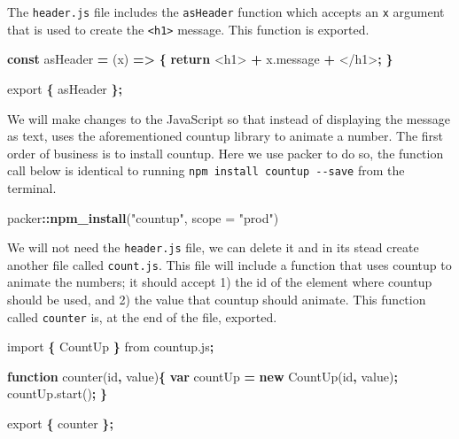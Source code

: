 \documentclass[
  10pt,
]{krantz}
\makeatletter
\newenvironment{Shaded}{\begin{snugshade}}{\end{snugshade}}
\newcommand{\AttributeTok}[1]{\textcolor[rgb]{0.61,0.61,0.61}{#1}}
\newcommand{\ControlFlowTok}[1]{\textcolor[rgb]{0.27,0.27,0.27}{\textbf{#1}}}
\newcommand{\DataTypeTok}[1]{\textcolor[rgb]{0.27,0.27,0.27}{#1}}
\newcommand{\ImportTok}[1]{#1}
\newcommand{\KeywordTok}[1]{\textcolor[rgb]{0.27,0.27,0.27}{\textbf{#1}}}
\newcommand{\NormalTok}[1]{#1}
\newcommand{\OperatorTok}[1]{\textcolor[rgb]{0.43,0.43,0.43}{\textbf{#1}}}
\newcommand{\StringTok}[1]{\textcolor[rgb]{0.5,0.5,0.5}{#1}}
\newcommand{\VariableTok}[1]{\textcolor[rgb]{0,0,0}{#1}}
\newenvironment{kframe}{%
\medskip{}
\setlength{\fboxsep}{.8em}
 \def\at@end@of@kframe{}%
 \ifinner\ifhmode%
  \def\at@end@of@kframe{\end{minipage}}%
  \begin{minipage}{\columnwidth}%
 \fi\fi%
 \def\FrameCommand##1{\hskip\@totalleftmargin \hskip-\fboxsep
 \colorbox{shadecolor}{##1}\hskip-\fboxsep
     \hskip-\linewidth \hskip-\@totalleftmargin \hskip\columnwidth}%
 \MakeFramed {\advance\hsize-\width
   \@totalleftmargin\z@ \linewidth\hsize
   \@setminipage}}%
 {\par\unskip\endMakeFramed%
 \at@end@of@kframe}
\renewenvironment{Shaded}{\begin{kframe}}{\end{kframe}}
\makeatother
\begin{document}
The \texttt{header.js} file includes the \texttt{asHeader} function which accepts an \texttt{x} argument that is used to create the \texttt{\textless{}h1\textgreater{}} message. This function is exported.

\begin{Shaded}
\begin{Highlighting}[]
\KeywordTok{const}\NormalTok{ asHeader }\OperatorTok{=}\NormalTok{ (x) }\KeywordTok{=>} \OperatorTok{\{}
  \ControlFlowTok{return} \StringTok{\textquotesingle{}<h1>\textquotesingle{}} \OperatorTok{+} \VariableTok{x}\NormalTok{.}\AttributeTok{message} \OperatorTok{+} \StringTok{\textquotesingle{}</h1>\textquotesingle{}}\OperatorTok{;}
\OperatorTok{\}}

\ImportTok{export} \OperatorTok{\{}\NormalTok{ asHeader }\OperatorTok{\};}
\end{Highlighting}
\end{Shaded}

We will make changes to the JavaScript so that instead of displaying the message as text, uses the aforementioned countup library to animate a number. The first order of business is to install countup. Here we use packer to do so, the function call below is identical to running \texttt{npm\ install\ countup\ -\/-save} from the terminal.

\begin{Shaded}
\begin{Highlighting}[]
\NormalTok{packer}\OperatorTok{::}\KeywordTok{npm\_install}\NormalTok{(}\StringTok{"countup"}\NormalTok{, }\DataTypeTok{scope =} \StringTok{"prod"}\NormalTok{) }
\end{Highlighting}
\end{Shaded}

We will not need the \texttt{header.js} file, we can delete it and in its stead create another file called \texttt{count.js}. This file will include a function that uses countup to animate the numbers; it should accept 1) the id of the element where countup should be used, and 2) the value that countup should animate. This function called \texttt{counter} is, at the end of the file, exported.

\begin{Shaded}
\begin{Highlighting}[]
\ImportTok{import} \OperatorTok{\{}\NormalTok{ CountUp }\OperatorTok{\}} \ImportTok{from} \StringTok{\textquotesingle{}countup.js\textquotesingle{}}\OperatorTok{;}

\KeywordTok{function} \AttributeTok{counter}\NormalTok{(id}\OperatorTok{,}\NormalTok{ value)}\OperatorTok{\{}
  \KeywordTok{var}\NormalTok{ countUp }\OperatorTok{=} \KeywordTok{new} \AttributeTok{CountUp}\NormalTok{(id}\OperatorTok{,}\NormalTok{ value)}\OperatorTok{;}
  \VariableTok{countUp}\NormalTok{.}\AttributeTok{start}\NormalTok{()}\OperatorTok{;}
\OperatorTok{\}}

\ImportTok{export} \OperatorTok{\{}\NormalTok{ counter }\OperatorTok{\};}
\end{Highlighting}
\end{Shaded}
\end{document}
